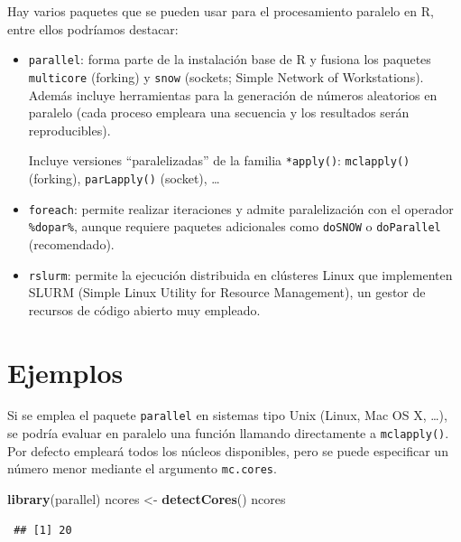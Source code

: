 \documentclass[
  spanish,
  10pt,
]{book}
\newenvironment{Shaded}{\begin{snugshade}}{\end{snugshade}}
\newcommand{\FunctionTok}[1]{\textcolor[rgb]{0.13,0.29,0.53}{\textbf{#1}}}
\newcommand{\NormalTok}[1]{#1}
\newcommand{\OtherTok}[1]{\textcolor[rgb]{0.56,0.35,0.01}{#1}}
\theoremstyle{break}
\theoremstyle{nonumberplain}
\begin{document}
Hay varios paquetes que se pueden usar para el procesamiento paralelo en R,
entre ellos podríamos destacar:

\begin{itemize}
\item
  \texttt{parallel}: forma parte de la instalación base de R y fusiona los paquetes \texttt{multicore} (forking) y \texttt{snow} (sockets; Simple Network of Workstations).
  Además incluye herramientas para la generación de números aleatorios en paralelo (cada proceso empleara una secuencia y los resultados serán reproducibles).

  Incluye versiones ``paralelizadas'' de la familia \texttt{*apply()}:
  \texttt{mclapply()} (forking), \texttt{parLapply()} (socket), \ldots{}
\item
  \texttt{foreach}: permite realizar iteraciones y admite paralelización con el operador \texttt{\%dopar\%}, aunque requiere paquetes adicionales como \texttt{doSNOW} o \texttt{doParallel} (recomendado).
\item
  \texttt{rslurm}: permite la ejecución distribuida en clústeres Linux que implementen SLURM (Simple Linux Utility for Resource Management), un gestor de recursos de código abierto muy empleado.
\end{itemize}

\section{Ejemplos}\label{ejemplos}

Si se emplea el paquete \texttt{parallel} en sistemas tipo Unix (Linux, Mac OS X, \ldots), se podría evaluar en paralelo una función llamando directamente a \texttt{mclapply()}.
Por defecto empleará todos los núcleos disponibles, pero se puede especificar un número menor mediante el argumento \texttt{mc.cores}.

\begin{Shaded}
\begin{Highlighting}[]
\FunctionTok{library}\NormalTok{(parallel)}
\NormalTok{ncores }\OtherTok{\textless{}{-}} \FunctionTok{detectCores}\NormalTok{()}
\NormalTok{ncores}
\end{Highlighting}
\end{Shaded}

\begin{verbatim}
 ## [1] 20
\end{verbatim}
\end{document}
